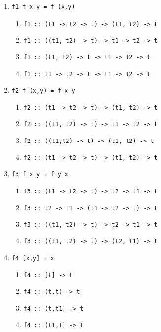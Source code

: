 \documentclass[12pt]{article}
\begin{document}
\begin{enumerate}[resume]
\item \begin{verbatim}
f1 f x y = f (x,y)
\end{verbatim}
\begin{enumerate}
\item {\tt f1 :: (t1 -> t2 -> t) -> (t1, t2) -> t}
\item {\tt f1 :: ((t1, t2) -> t) -> t1 -> t2 -> t}
\item {\tt f1 :: (t1, t2) -> t -> t1 -> t2 -> t}
\item {\tt f1 :: t1 -> t2 -> t -> t1 -> t2 -> t}
\end{enumerate}

\item \begin{verbatim}
f2 f (x,y) = f x y
\end{verbatim}
\begin{enumerate}
\item {\tt f2 :: (t1 -> t2 -> t) -> (t1, t2) -> t}
\item {\tt f2 :: ((t1, t2) -> t) -> t1 -> t2 -> t}
\item {\tt f2 :: ((t1,t2) -> t) -> (t1, t2) -> t}
\item {\tt f2 :: (t1 -> t2 -> t) -> (t1, t2) -> t}
\end{enumerate}

\item \begin{verbatim}
f3 f x y = f y x
\end{verbatim}
\begin{enumerate}
\item {\tt f3 :: (t1 -> t2 -> t) -> t2 -> t1 -> t}
\item {\tt f3 :: t2 -> t1 -> (t1 -> t2 -> t) -> t}
\item {\tt f3 :: ((t1, t2) -> t) -> t2 -> t1 -> t}
\item {\tt f3 :: ((t1, t2) -> t) -> (t2, t1) -> t}
\end{enumerate}

\item \begin{verbatim}
f4 [x,y] = x
\end{verbatim}
\begin{enumerate}
\item {\tt f4 :: [t] -> t}
\item {\tt f4 :: (t,t) -> t}
\item {\tt f4 :: (t,t1) -> t}
\item {\tt f4 :: (t1,t) -> t}
\end{enumerate}


\end{enumerate}
\end{document}
